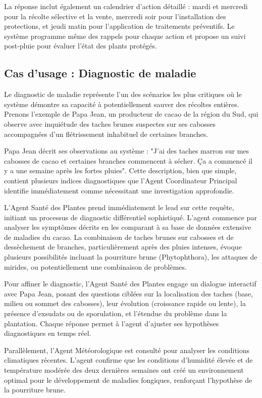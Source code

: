 La réponse inclut également un calendrier d'action détaillé : mardi et mercredi pour la récolte sélective et la vente, mercredi soir pour l'installation des protections, et jeudi matin pour l'application de traitements préventifs. Le système programme même des rappels pour chaque action et propose un suivi post-pluie pour évaluer l'état des plants protégés.

\subsection{Cas d'usage : Diagnostic de maladie}

Le diagnostic de maladie représente l'un des scénarios les plus critiques où le système démontre sa capacité à potentiellement sauver des récoltes entières. Prenons l'exemple de Papa Jean, un producteur de cacao de la région du Sud, qui observe avec inquiétude des taches brunes suspectes sur ses cabosses accompagnées d'un flétrissement inhabituel de certaines branches.

Papa Jean décrit ses observations au système : "J'ai des taches marron sur mes cabosses de cacao et certaines branches commencent à sécher. Ça a commencé il y a une semaine après les fortes pluies". Cette description, bien que simple, contient plusieurs indices diagnostiques que l'Agent Coordinateur Principal identifie immédiatement comme nécessitant une investigation approfondie.

L'Agent Santé des Plantes prend immédiatement le lead sur cette requête, initiant un processus de diagnostic différentiel sophistiqué. L'agent commence par analyser les symptômes décrits en les comparant à sa base de données extensive de maladies du cacao. La combinaison de taches brunes sur cabosses et de dessèchement de branches, particulièrement après des pluies intenses, évoque plusieurs possibilités incluant la pourriture brune (Phytophthora), les attaques de mirides, ou potentiellement une combinaison de problèmes.

Pour affiner le diagnostic, l'Agent Santé des Plantes engage un dialogue interactif avec Papa Jean, posant des questions ciblées sur la localisation des taches (base, milieu ou sommet des cabosses), leur évolution (croissance rapide ou lente), la présence d'exsudats ou de sporulation, et l'étendue du problème dans la plantation. Chaque réponse permet à l'agent d'ajuster ses hypothèses diagnostiques en temps réel.

Parallèlement, l'Agent Météorologique est consulté pour analyser les conditions climatiques récentes. L'agent confirme que les conditions d'humidité élevée et de température modérée des deux dernières semaines ont créé un environnement optimal pour le développement de maladies fongiques, renforçant l'hypothèse de la pourriture brune.

